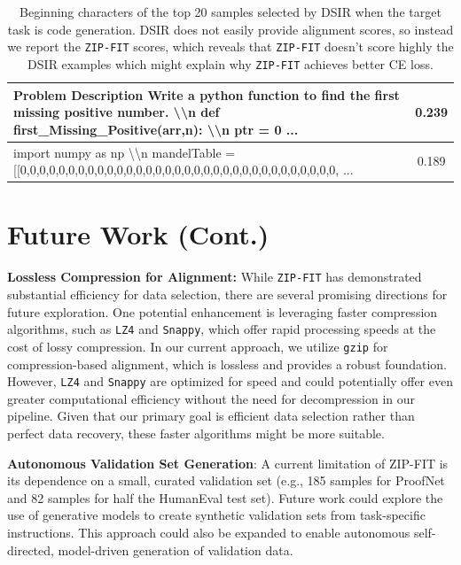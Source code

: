 \begin{table}[htbp]
\begin{tabular}{|p{10cm}|c|}
        \hline
        Problem Description Write a python function to find the first missing positive number. \textbackslash\textbackslash n def first\_Missing\_Positive(arr,n): \textbackslash\textbackslash n ptr = 0 ... & 0.239 \\
        \hline 
        import numpy as np \textbackslash\textbackslash n mandelTable = [[0,0,0,0,0,0,0,0,0,0,0,0,0,0,0,0,0,0,0,0,0,0,0,0,0,0,0,0,0,0,0,0,0, ... & 0.189 \\
        \hline
    \end{tabular}\label{tab:code_top_20_dsir}
    \caption{Beginning characters of the top 20 samples selected by DSIR when the target task is code generation. 
    DSIR does not easily provide alignment scores, so instead we report the \texttt{ZIP-FIT} scores, which reveals that \texttt{ZIP-FIT} doesn't score highly the DSIR examples which might explain why \texttt{ZIP-FIT} achieves better CE loss. 
    }
\end{table}

\section{Future Work (Cont.)}

\textbf{Lossless Compression for Alignment:} While \texttt{ZIP-FIT} has demonstrated substantial efficiency for data selection, there are several promising directions for future exploration. 
One potential enhancement is leveraging faster compression algorithms, such as \texttt{LZ4} and \texttt{Snappy}, which offer rapid processing speeds at the cost of lossy compression. 
In our current approach, we utilize \texttt{gzip} for compression-based alignment, which is lossless and provides a robust foundation. 
However, \texttt{LZ4} and \texttt{Snappy} are optimized for speed and could potentially offer even greater computational efficiency without the need for decompression in our pipeline. 
Given that our primary goal is efficient data selection rather than perfect data recovery, these faster algorithms might be more suitable. 

\textbf{Autonomous Validation Set Generation}: 
A current limitation of ZIP-FIT is its dependence on a small, curated validation set (e.g., 185 samples for ProofNet and 82 samples for half the HumanEval test set). 
Future work could explore the use of generative models to create synthetic validation sets from task-specific instructions. 
This approach could also be expanded to enable autonomous self-directed, model-driven generation of validation data. 






